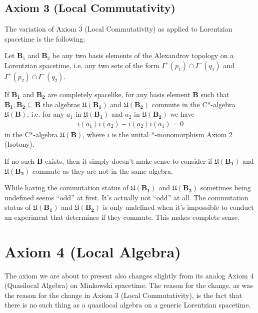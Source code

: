 \subsection{Axiom 3 (Local Commutativity)}
The variation of Axiom 3 (Local Commutativity) as applied to Lorentzian spacetime is the following:

\begin{axiom}
    Let $\mathbf{B}_1$ and $\mathbf{B}_2$ be any two basis elements of the Alexandrov topology on a Lorentzian spacetime, i.e. any two sets of the form $I^+(p_1) \cap I^-(q_1)$ and $I^+(p_2) \cap I^-(q_2)$.
    
    If $\mathbf{B_1}$ and $\mathbf{B_2}$ are completely spacelike, for any basis element $\mathbf{B}$ such that $\mathbf{B_1}, \mathbf{B_2} \subseteq \mathbf{B}$ the algebras $\mathfrak{U}(\mathbf{B_1})$ and $\mathfrak{U}(\mathbf{B_2})$ commute in the C*-algebra $\mathfrak{U}(\mathbf{B})$, i.e. for any $a_1$ in $\mathfrak{U}(\mathbf{B_1})$ and $a_2$ in $\mathfrak{U}(\mathbf{B_2})$ we have
    \begin{align}
        i(a_1) i(a_2) - i(a_2) i(a_1) = 0
    \end{align}
    in the C*-algebra $\mathfrak{U}(\mathbf{B})$, where $i$ is the unital *-monomorphism Axiom 2 (Isotony).
    
    If no such $\mathbf{B}$ exists, then it simply doesn't make sense to consider if $\mathfrak{U}(\mathbf{B_1})$ and $\mathfrak{U}(\mathbf{B_2})$ commute as they are not in the same algebra.
\end{axiom}

While having the commutation status of $\mathfrak{U}(\mathbf{B_1})$ and $\mathfrak{U}(\mathbf{B_2})$ sometimes being undefined seems ``odd'' at first. It's actually not ``odd'' at all. The commutation status of $\mathfrak{U}(\mathbf{B_1})$ and $\mathfrak{U}(\mathbf{B_2})$ is only undefined when it's impossible to conduct an experiment that determines if they commute. This makes complete sense.

\section{Axiom 4 (Local Algebra)}\label{sctn:axiom-4-(local-algebra)}
The axiom we are about to present also changes slightly from its analog Axiom 4 (Quasilocal Algebra) on Minkowski spacetime. The reason for the change, as was the reason for the change in Axiom 3 (Local Commutativity), is the fact that there is no such thing as a quasilocal algebra on a generic Lorentzian spacetime.

